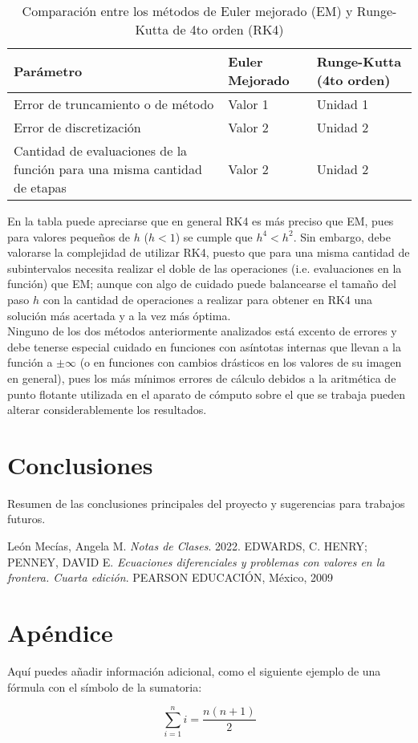 \documentclass[a4paper,12pt]{article}
\begin{document}
\begin{table}[h!]
\centering
\begin{tabular}{|p{4cm}|p{4cm}|p{4cm}|}
\hline
\textbf{Parámetro} & \textbf{Euler Mejorado} & \textbf{Runge-Kutta (4to orden)} \\
\hline
Error de truncamiento o de método & Valor 1 & Unidad 1 \\
\hline
Error de discretización & Valor 2 & Unidad 2 \\
\hline
Cantidad de evaluaciones de la función para una misma cantidad de etapas & Valor 2 & Unidad 2 \\
\hline
\end{tabular}
\caption{Comparación entre los métodos de Euler mejorado (EM) y Runge-Kutta de 4to orden (RK4)}
\label{tab:resultados}
\end{table}

En la tabla puede apreciarse que en general RK4 es más preciso que EM, pues para valores pequeños de \(h\) (\(h < 1\)) se cumple que \(h^4<h^2\). Sin embargo, debe valorarse la complejidad de utilizar RK4, puesto que para una misma cantidad de subintervalos necesita realizar el doble de las operaciones (i.e. evaluaciones en la función) que EM; aunque con algo de cuidado puede balancearse el tamaño del paso \(h\) con la cantidad de operaciones a realizar para obtener en RK4 una solución más acertada y a la vez más óptima.\\
Ninguno de los dos métodos anteriormente analizados está excento de errores y debe tenerse especial cuidado en funciones con asíntotas internas que llevan a la función a \(\pm\infty\) (o en funciones con cambios drásticos en los valores de su imagen en general), pues los más mínimos errores de cálculo debidos a la aritmética de punto flotante utilizada en el aparato de cómputo sobre el que se trabaja pueden alterar considerablemente los resultados.

\section{Conclusiones}
Resumen de las conclusiones principales del proyecto y sugerencias para trabajos futuros.


\begin{thebibliography}{99}
León Mecías, Angela M. \textit{Notas de Clases}. 2022.
EDWARDS, C. HENRY; PENNEY, DAVID E. \textit{Ecuaciones diferenciales y problemas con valores en la frontera. Cuarta edición}. PEARSON EDUCACIÓN, México, 2009
\end{thebibliography}

\section{Apéndice}
Aquí puedes añadir información adicional, como el siguiente ejemplo de una fórmula con el símbolo de la sumatoria:

\begin{equation}
\sum_{i=1}^{n} i = \frac{n(n+1)}{2}
\end{equation}
\end{document}
